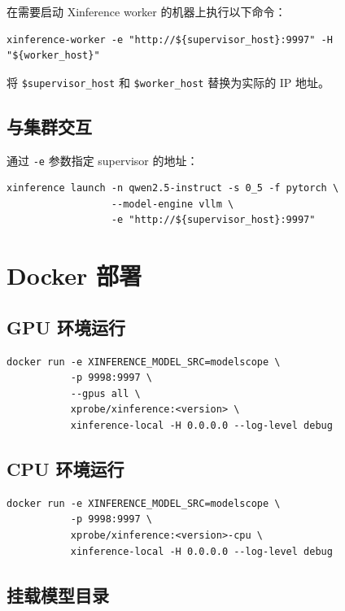 \documentclass[12pt,UTF8]{ctexbook}
\begin{document}
在需要启动 Xinference worker 的机器上执行以下命令：

\begin{lstlisting}
xinference-worker -e "http://${supervisor_host}:9997" -H "${worker_host}"
\end{lstlisting}

将 \texttt{\${supervisor\_host}} 和 \texttt{\${worker\_host}} 替换为实际的 IP 地址。

\section{与集群交互}
\label{sec:interact_cluster}

通过 \texttt{-e} 参数指定 supervisor 的地址：

\begin{lstlisting}
xinference launch -n qwen2.5-instruct -s 0_5 -f pytorch \
                  --model-engine vllm \
                  -e "http://${supervisor_host}:9997"
\end{lstlisting}

\chapter{Docker 部署}
\label{chap:docker_deployment}

\section{GPU 环境运行}
\label{sec:docker_gpu}

\begin{lstlisting}
docker run -e XINFERENCE_MODEL_SRC=modelscope \
           -p 9998:9997 \
           --gpus all \
           xprobe/xinference:<version> \
           xinference-local -H 0.0.0.0 --log-level debug
\end{lstlisting}

\section{CPU 环境运行}
\label{sec:docker_cpu}

\begin{lstlisting}
docker run -e XINFERENCE_MODEL_SRC=modelscope \
           -p 9998:9997 \
           xprobe/xinference:<version>-cpu \
           xinference-local -H 0.0.0.0 --log-level debug
\end{lstlisting}

\section{挂载模型目录}
\label{sec:docker_mount}
\end{document}

